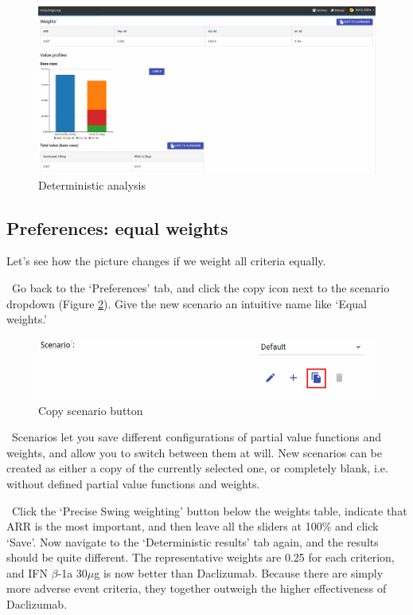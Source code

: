 \documentclass[00_mcda_tutorial.tex]{subfiles}
\begin{document}
\begin{figure}[!h]
  \centering
  \includegraphics[width=\textwidth]{fig/deterministicRanked.png}
  \caption{Deterministic analysis}
  \label{fig:deterministic_ranked}
\end{figure}

\subsection*{Preferences: equal weights}
Let’s see how the picture changes if we weight all criteria equally.
\newline

\noindent \leftpointright \, Go back to the ‘Preferences’ tab, and click the copy icon next to the scenario dropdown (Figure \ref{fig:copy_scenario}). Give the new scenario an intuitive name like ‘Equal weights.’
\newline

\begin{figure}[!h]
  \centering
  \includegraphics[width=.5\textwidth]{fig/copyScenario.png}
  \caption{Copy scenario button}
  \label{fig:copy_scenario}
\end{figure}

\noindent \faGraduationCap \, Scenarios let you save different configurations of partial value functions and weights, and allow you to switch between them at will. New scenarios can be created as either a copy of the currently selected one, or completely blank, i.e. without defined partial value functions  and weights.
\newline

\noindent \leftpointright \, Click the ‘Precise Swing weighting’ button below the weights table, indicate that ARR is the most important, and then leave all the sliders at 100\% and click ‘Save’. Now navigate to the ‘Deterministic results’ tab again, and the results should be quite different. The representative weights are 0.25 for each criterion, and IFN $\beta$-1a 30$\mu$g is now better than Daclizumab. Because there are simply more adverse event criteria, they together outweigh the higher effectiveness of Daclizumab.
\newline
\end{document}

